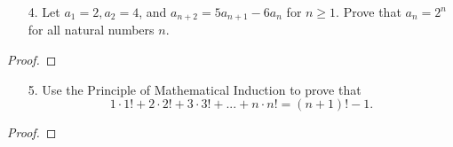 \documentclass[10pt]{article}
\theoremstyle{definition}
\theoremstyle{plain}
\begin{document}
\pagebreak



\begin{enumerate}
  \item[4.] Let $a_1 = 2, a_2 = 4$, and $a_{n+2} = 5a_{n+1} - 6a_n$ for $n \geq 1$.  Prove that $a_n = 2^n$ for all natural numbers $n$.
\end{enumerate}

\begin{proof}
\end{proof}



\pagebreak



\begin{enumerate}
  \item[5.] Use the Principle of Mathematical Induction to prove that
  $$1 \cdot 1! + 2 \cdot 2! + 3 \cdot 3! + ... + n \cdot n! = (n+1)! - 1.$$
\end{enumerate}

\begin{proof}
\end{proof}
\end{document}
